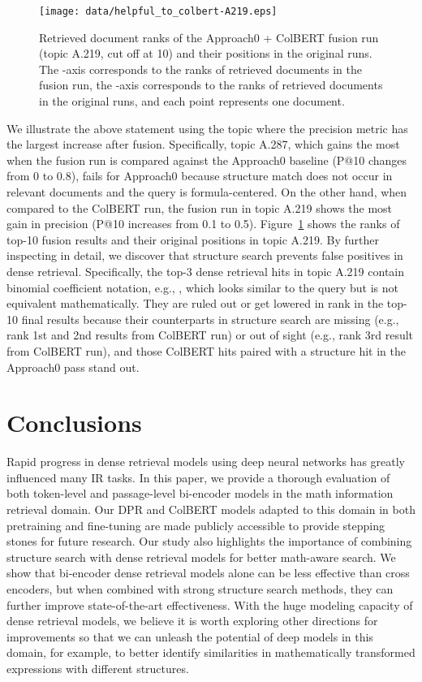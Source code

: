 \documentclass[11pt]{article}
\begin{document}
\begin{table}
\begin{figure}
  \centering
  \vspace{-0.2in}
  \texttt{[image: data/helpful\_to\_colbert-A219.eps]}
  \caption{Retrieved document ranks of the Approach0 + ColBERT fusion run (topic A.219, cut off at 10) and their positions in the original runs. The -axis corresponds to the ranks of retrieved documents in the fusion run, the -axis corresponds to the ranks of retrieved documents in the original runs, and each point represents one document.}
  \label{fig:rankchange}
\end{figure}

We illustrate the above statement using the topic where the precision metric has the largest increase after fusion.
Specifically, topic A.287, which gains the most when the fusion run is compared against the Approach0 baseline (P@10 changes from 0 to 0.8), fails for Approach0 because structure match does not occur in relevant documents and the query is formula-centered. 
On the other hand, when compared to the ColBERT run, the fusion run in topic A.219 shows the most gain in precision (P@10 increases from 0.1 to 0.5).
Figure~\ref{fig:rankchange} shows the ranks of top-10 fusion results and their original positions in topic A.219.
By further inspecting in detail, we discover that structure search prevents false positives in dense retrieval.
Specifically, the top-3 dense retrieval hits in topic A.219 contain binomial coefficient notation, e.g., , which looks similar to the query  but is not equivalent mathematically.
They are ruled out or get lowered in rank in the top-10 final results because their counterparts in structure search are missing (e.g., rank 1st and 2nd results from ColBERT run) or out of sight (e.g., rank 3rd result from ColBERT run), and those ColBERT hits paired with a structure hit in the Approach0 pass stand out.


\section{Conclusions}

Rapid progress in dense retrieval models using deep neural networks has greatly influenced many IR tasks.
In this paper, we provide a thorough evaluation of both token-level and passage-level bi-encoder models in the math information retrieval domain.
Our DPR and ColBERT models adapted to this domain in both pretraining and fine-tuning are made publicly accessible to provide stepping stones for future research.
Our study also highlights the importance of combining structure search with dense retrieval models for better math-aware search.
We show that bi-encoder dense retrieval models alone can be less effective than cross encoders, but when combined with strong structure search methods, they can further improve state-of-the-art effectiveness.
With the huge modeling capacity of dense retrieval models, we believe it is worth exploring other directions for improvements so that we can unleash the potential of deep models in this domain, for example, to better identify similarities in mathematically transformed expressions with different structures.


\end{table}
\end{document}
